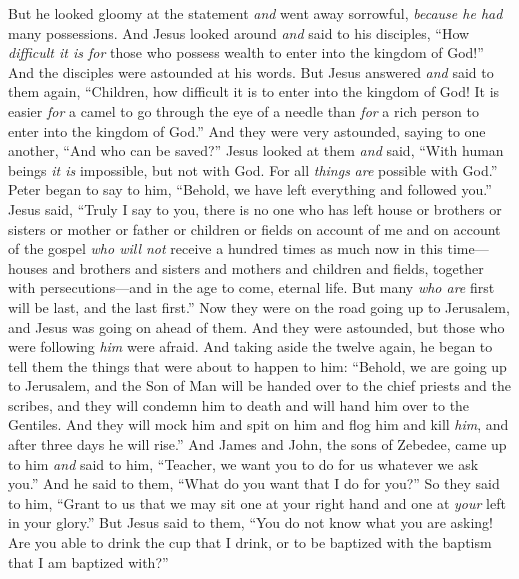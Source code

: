 \begin{biblechapter}
\verse But he looked gloomy at the statement \textit{and} went away sorrowful, \textit{because he had} many possessions.
\verse And Jesus looked around \textit{and} said to his disciples, “How \textit{difficult it is for} those who possess wealth to enter into the kingdom of God!”
\verse And the disciples were astounded at his words. But Jesus answered \textit{and} said to them again, “Children, how difficult it is to enter into the kingdom of God!
\verse It is easier \textit{for} a camel to go through the eye of a needle than \textit{for} a rich person to enter into the kingdom of God.”
\verse And they were very astounded, saying to one another, “And who can be saved?”
\verse Jesus looked at them \textit{and} said, “With human beings \textit{it is} impossible, but not with God. For all \textit{things} \textit{are} possible with God.”
\verse Peter began to say to him, “Behold, we have left everything and followed you.”
\verse Jesus said, “Truly I say to you, there is no one who has left house or brothers or sisters or mother or father or children or fields on account of me and on account of the gospel
\verse \textit{who will not} receive a hundred times as much now in this time—houses and brothers and sisters and mothers and children and fields, together with persecutions—and in the age to come, eternal life.
\verse But many \textit{who are} first will be last, and the last first.”
 Now they were on the road going up to Jerusalem, and Jesus was going on ahead of them. And they were astounded, but those who were following \textit{him} were afraid. And taking aside the twelve again, he began to tell them the things that were about to happen to him:
\verse “Behold, we are going up to Jerusalem, and the Son of Man will be handed over to the chief priests and the scribes, and they will condemn him to death and will hand him over to the Gentiles.
\verse And they will mock him and spit on him and flog him and kill \textit{him}, and after three days he will rise.”
 And James and John, the sons of Zebedee, came up to him \textit{and} said to him, “Teacher, we want you to do for us whatever we ask you.”
\verse And he said to them, “What do you want that I do for you?”
\verse So they said to him, “Grant to us that we may sit one at your right hand and one at \textit{your} left in your glory.”
\verse But Jesus said to them, “You do not know what you are asking! Are you able to drink the cup that I drink, or to be baptized with the baptism that I am baptized with?”

\end{biblechapter}
